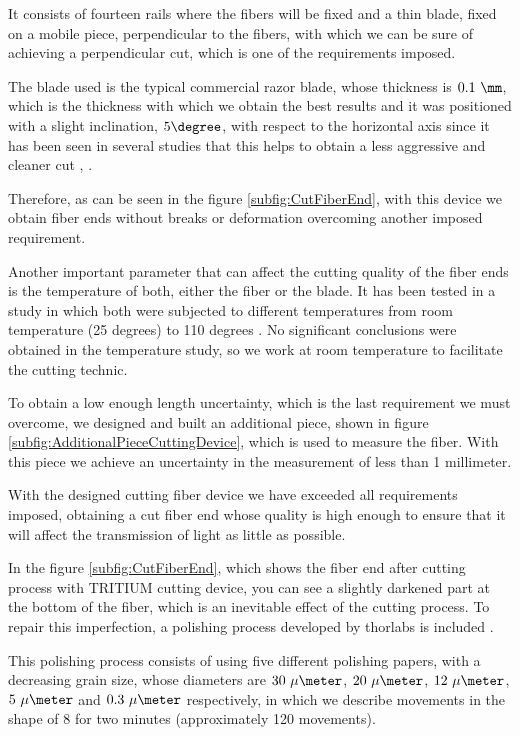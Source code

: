 It consists of fourteen rails where the fibers will be fixed and a thin blade, fixed on a mobile piece, perpendicular to the fibers, with which we can be sure of achieving a perpendicular cut, which is one of the requirements imposed.

The blade used is the typical commercial razor blade, whose thickness is $0.1~\mm$, which is the thickness with which we obtain the best results and it was positioned with a slight inclination, $5\degree$, with respect to the horizontal axis since it has been seen in several studies that this helps to obtain a less aggressive and cleaner cut  \cite{AngleBlade}, \cite{TemperatureBlade}.

Therefore, as can be seen in the figure \ref{subfig:CutFiberEnd}, with this device we obtain fiber ends without breaks or deformation overcoming another imposed requirement.

Another important parameter that can affect the cutting quality of the fiber ends is the temperature of both, either the fiber or the blade. It has been tested in a study in which both were subjected to different temperatures from room temperature (25 degrees) to 110 degrees \cite{TFGAlberto}. No significant conclusions were obtained in the temperature study, so we work at room temperature to facilitate the cutting technic.

To obtain a low enough length uncertainty, which is the last requirement we must overcome, we designed and built an additional piece, shown in figure \ref{subfig:AdditionalPieceCuttingDevice}, which is used to measure the fiber. With this piece we achieve an uncertainty in the measurement of less than 1 millimeter.

With the designed cutting fiber device we have exceeded all requirements imposed, obtaining a cut fiber end whose quality is high enough to ensure that it will affect the transmission of light as little as possible.

In the figure \ref{subfig:CutFiberEnd}, which shows the fiber end after cutting process with TRITIUM cutting device, you can see a slightly darkened part at the bottom of the fiber, which is an inevitable effect of the cutting process. To repair this imperfection, a polishing process developed by thorlabs is included \cite{DiamondThorlabs}. 

This polishing process consists of using five different polishing papers, with a decreasing grain size, whose diameters are $30~\mu\meter$, $20~\mu\meter$, $12~\mu\meter$, $5~\mu\meter$ and $0.3~\mu\meter$ respectively, in which we describe movements in the shape of 8 for two minutes (approximately 120 movements). 

